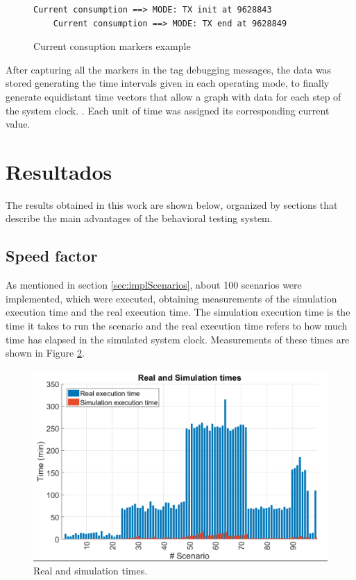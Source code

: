 \documentclass[journal]{IEEEtran}	%
\begin{document}
\begin{figure}[H]
\centering
\begin{lstlisting}[style=scenarioStyle]
    Current consumption ==> MODE: TX init at 9628843
    Current consumption ==> MODE: TX end at 9628849
\end{lstlisting}
\caption{Current consuption markers example}
\label{fig:markers}
\end{figure}

After capturing all the markers in the tag debugging messages, the data was stored generating the time intervals given in each operating mode, to finally generate equidistant time vectors that allow a graph with data for each step of the system clock. . Each unit of time was assigned its corresponding current value.

\section{Resultados}
The results obtained in this work are shown below, organized by sections that describe the main advantages of the behavioral testing system.

\subsection{Speed factor}
As mentioned in section \ref{sec:implScenarios}, about 100 scenarios were implemented, which were executed, obtaining measurements of the simulation execution time and the real execution time. The simulation execution time is the time it takes to run the scenario and the real execution time refers to how much time has elapsed in the simulated system clock. Measurements of these times are shown in Figure \ref{fig:scenarios1}.

\begin{figure}[t]
\centering
\includegraphics[width=0.95\columnwidth]{scenarios4.png}
\caption{Real and simulation times.}
\label{fig:scenarios1}
\end{figure}
\end{document}
